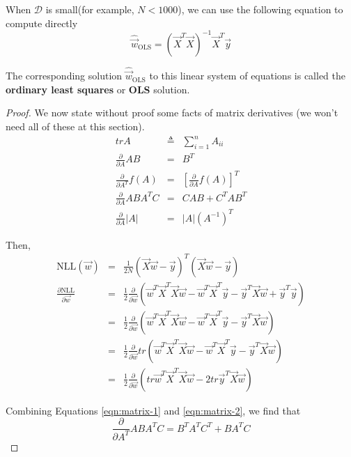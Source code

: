 When $\mathcal{D}$ is small(for example, $N < 1000$), we can use the following equation to compute  directly
\begin{equation}
\hat{\vec{w}}_{\mathrm{OLS}}=(\vec{X}^T\vec{X})^{-1}\vec{X}^T\vec{y}
\end{equation}

The corresponding solution $\hat{\vec{w}}_{\mathrm{OLS}}$ to this linear system of equations is called the \textbf{ordinary least squares} or \textbf{OLS} solution.

\begin{proof}
We now state without proof some facts of matrix derivatives (we won’t need all of these at this section).
\begin{eqnarray}
trA &\triangleq& \sum\limits_{i=1}^n A_{ii} \nonumber \\
\frac{\partial}{\partial A}AB &=& B^T \\
\frac{\partial}{\partial A^T}f(A) &=& \left[\frac{\partial}{\partial A}f(A)\right]^T \label{eqn:matrix-1} \\
\frac{\partial}{\partial A}ABA^TC &=& CAB+C^TAB^T \label{eqn:matrix-2} \\
\frac{\partial}{\partial A}|A| &=& |A|(A^{-1})^T
\end{eqnarray}

Then,
\begin{eqnarray*}
\text{NLL}(\vec{w}) &=& \frac{1}{2N}(\vec{X}\vec{w}-\vec{y})^T(\vec{X}\vec{w}-\vec{y}) \\
\frac{\partial \text{NLL}}{\partial\vec{w}} &=& \frac{1}{2} \frac{\partial}{\partial\vec{w}} (\vec{w}^T\vec{X}^T\vec{X}\vec{w}-\vec{w}^T\vec{X}^T\vec{y}-\vec{y}^T\vec{X}\vec{w}+\vec{y}^T\vec{y}) \\
                           &=& \frac{1}{2} \frac{\partial}{\partial\vec{w}} (\vec{w}^T\vec{X}^T\vec{X}\vec{w}-\vec{w}^T\vec{X}^T\vec{y}-\vec{y}^T\vec{X}\vec{w}) \\
						   &=& \frac{1}{2} \frac{\partial}{\partial\vec{w}} tr(\vec{w}^T\vec{X}^T\vec{X}\vec{w}-\vec{w}^T\vec{X}^T\vec{y}-\vec{y}^T\vec{X}\vec{w}) \\
						   &=& \frac{1}{2} \frac{\partial}{\partial\vec{w}} (tr\vec{w}^T\vec{X}^T\vec{X}\vec{w}-2tr\vec{y}^T\vec{X}\vec{w})
\end{eqnarray*}

Combining Equations \ref{eqn:matrix-1} and \ref{eqn:matrix-2}, we find that 
\begin{equation*}
\frac{\partial}{\partial A^T}ABA^TC = B^TA^TC^T+BA^TC
\end{equation*}


\end{proof}
